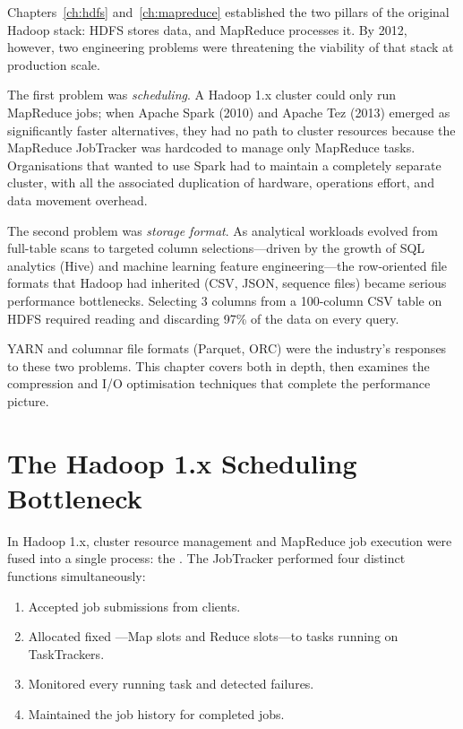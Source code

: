 \bigskip

Chapters~\ref{ch:hdfs} and~\ref{ch:mapreduce} established the two
pillars of the original Hadoop stack: HDFS stores data, and MapReduce
processes it. By 2012, however, two engineering problems were threatening
the viability of that stack at production scale.

The first problem was \emph{scheduling}. A Hadoop 1.x cluster could only
run MapReduce jobs; when Apache Spark (2010) and Apache Tez (2013)
emerged as significantly faster alternatives, they had no path to cluster
resources because the MapReduce JobTracker was hardcoded to manage only
MapReduce tasks. Organisations that wanted to use Spark had to maintain
a completely separate cluster, with all the associated duplication of
hardware, operations effort, and data movement overhead.

The second problem was \emph{storage format}. As analytical workloads
evolved from full-table scans to targeted column selections---driven by
the growth of SQL analytics (Hive) and machine learning feature
engineering---the row-oriented file formats that Hadoop had inherited
(CSV, JSON, sequence files) became serious performance bottlenecks.
Selecting 3 columns from a 100-column CSV table on HDFS required reading
and discarding 97\% of the data on every query.

YARN \parencite{YARN2013} and columnar file formats (Parquet, ORC)
were the industry's responses to these two problems. This chapter covers
both in depth, then examines the compression and I/O optimisation
techniques that complete the performance picture.

\section{The Hadoop 1.x Scheduling Bottleneck}
\label{sec:hadoop1-bottleneck}

In Hadoop 1.x, cluster resource management and MapReduce job execution
were fused into a single process: the . The JobTracker
performed four distinct functions simultaneously:
\begin{enumerate}
  \item Accepted job submissions from clients.
  \item Allocated fixed ---Map slots and Reduce slots---to
        tasks running on TaskTrackers.
  \item Monitored every running task and detected failures.
  \item Maintained the job history for completed jobs.
\end{enumerate}

